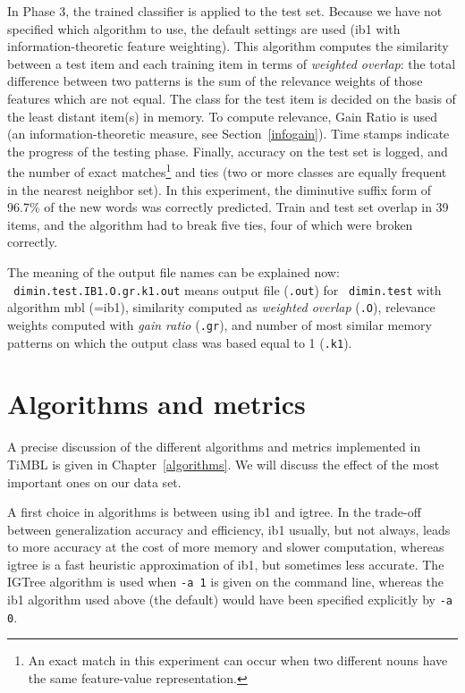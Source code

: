 \documentclass{book}
\begin{document}
In Phase 3, the trained classifier is applied to the test set. Because
we have not specified which algorithm to use, the default settings are
used ({\sc ib1} with information-theoretic feature weighting). This
algorithm computes the similarity between a test item and each
training item in terms of {\em weighted overlap}: the total difference
between two patterns is the sum of the relevance weights of those
features which are not equal. The class for the test item is decided
on the basis of the least distant item(s) in memory. To compute
relevance, Gain Ratio is used (an information-theoretic measure, see
Section~\ref{infogain}). Time stamps indicate the progress of the
testing phase. Finally, accuracy on the test set is logged, and the
number of exact matches\footnote{An exact match in this experiment can
  occur when two different nouns have the same feature-value
  representation.} and ties (two or more classes are equally frequent
in the nearest neighbor set). In this experiment, the diminutive
suffix form of 96.7\% of the new words was correctly predicted. Train
and test set overlap in 39 items, and the algorithm had to break five
ties, four of which were broken correctly.

The meaning of the output file names can be explained now:\\ {\tt
dimin.test.IB1.O.gr.k1.out} means output file ({\tt .out}) for {\tt
dimin.test} with algorithm {\sc mbl} (={\sc ib1}), similarity computed
as {\em weighted overlap} ({\tt .O}), relevance weights computed with
{\em gain ratio} ({\tt .gr}), and number of most similar memory
patterns on which the output class was based equal to 1 ({\tt .k1}).

\section{Algorithms and metrics}

A precise discussion of the different algorithms and metrics
implemented in TiMBL is given in Chapter~\ref{algorithms}. We will
discuss the effect of the most important ones on our data set.

A first choice in algorithms is between using {\sc ib1} and {\sc
igtree}. In the trade-off between generalization accuracy and
efficiency, {\sc ib1} usually, but not always, leads to more accuracy
at the cost of more memory and slower computation, whereas {\sc
igtree} is a fast heuristic approximation of {\sc ib1}, but sometimes
less accurate. The {\sc IGTree} algorithm is used when {\tt -a 1} is
given on the command line, whereas the {\sc ib1} algorithm used above
(the default) would have been specified explicitly by {\tt -a 0}. 
\end{document}
